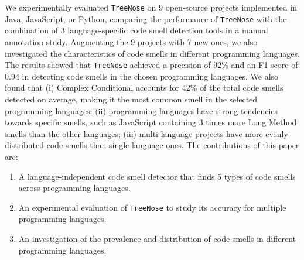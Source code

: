 We experimentally evaluated \texttt{TreeNose} on 9 open-source projects
implemented in Java, JavaScript, or Python, comparing the performance of
\texttt{TreeNose} with the combination of 3 language-specific code smell
detection tools in a manual annotation study. Augmenting the 9 projects with 7
new ones, we also investigated the characteristics of code smells in different
programming languages.
%
%
The results showed that \texttt{TreeNose} achieved a precision of 92\% and an F1
score of 0.94 in detecting code smells in the chosen programming languages. We
also found that (i) Complex Conditional accounts for 42\% of the total code
smells detected on average, making it the most common smell in the selected
programming languages; (ii) programming languages have strong tendencies towards
specific smells, such as JavaScript containing 3 times more Long Method smells
than the other languages; (iii) multi-language projects have more evenly
distributed code smells than single-language ones.
%
%
The contributions of this paper are:

\begin{enumerate}
    \item A language-independent code smell detector that finds 5 types of code
        smells across programming languages.
    \item An experimental evaluation of \texttt{TreeNose} to study its accuracy
        for multiple programming languages.
    \item An investigation of the prevalence and distribution of code
        smells in different programming languages.
\end{enumerate}
